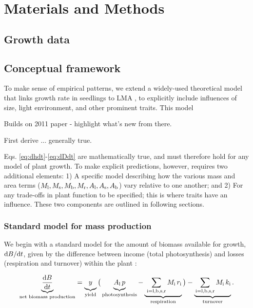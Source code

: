 \documentclass[12pt, a4paper]{article}
\begin{document}
\section{Materials and Methods}\label{materials-and-methods}

\subsection{Growth data}\label{growth-data}


\subsection{Conceptual framework}\label{conceptual-framework}

To make sense of empirical patterns, we extend a widely-used theoretical model that links growth rate in
seedlings to LMA \citep{lambers-1992, wright_cross-2000}, to explicitly include influences of
size, light environment, and other prominent traits. This model

Builds on 2011 paper - highlight what's new from there.

First derive ... generally true.

Eqs. \ref{eq:dhdt}-\ref{eq:dDdt} are mathematically true, and must
therefore hold for any model of plant growth. To make explicit
predictions, however, requires two additional elements: 1) A specific
model describing how the various mass and area terms
($M_{\rm l}, M_\textrm{s}, M_{\rm b}, M_{\rm r}, A_{\rm l}, A_\textrm{s}, A_{\rm b}$)
vary relative to one another; and 2) For any trade-offs in plant
function to be specified; this is where traits have an influence.  These two components are outlined in following sections.

\subsubsection{Standard model for mass production}

We begin with a standard model for the amount of biomass available for
growth, ${\rm d}B / {\rm d}t$, given by the difference between income
(total photosynthesis) and losses (respiration and turnover) within the
plant \citep{makela-1997, Thornley-2000, falster-2011}:

\begin{equation}\label{eq:dbdt}
\underbrace{\strut \frac{{\rm d}B}{{\rm d}t}}_\textrm{net biomass production}
  = \underbrace{\strut y}_\textrm{yield}
    \big( \underbrace{\strut A_{\rm l} \, p}_\textrm{photosynthesis} -
     \underbrace{\strut \,\sum_\textrm{i=l,b,s,r}{M_\textrm{i} \, r_\textrm{i}}}_\textrm{respiration}\big)
    - \underbrace{\strut \sum_\textrm{i=l,b,s,r}{M_\textrm{i} \, k_\textrm{i}}}_\textrm{turnover}.
\end{equation}
\end{document}
